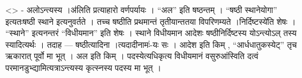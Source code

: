 \textless{}\textgreater{} - अलोऽन्त्यस्य ।अ॑लिति प्रत्याहारो वर्णपर्यायः
। ``अल'' इति षष्ठन्तम् । ``षष्ठी स्थानेयोगा'' इत्यतःषष्ठी स्थाने
इत्यनुवर्तते । तच्च षष्ठीति प्रथमान्तं तृतीयान्ततया विपरिणम्यते
।निर्दिष्टस्ये॑ति शेषः । ``स्थाने'' इत्यनन्तरं ``विधीयमान'' इति शेषः ।
स्थाने विधीयमान आदेशः षष्ठीनिर्दिष्टस्य योऽन्त्योऽल् तस्य स्यादित्यर्थः
। तदाह --- षष्ठीत्यादिना ।त्यदादीनामः॑-यः सः । आदेश इति किम् ,
``आर्धधातुकस्येट्'' तृच ऋकारात् पूर्वो मा भूत् । अल इति किम् ।
पदस्येत्यधिकृत्य विधीयमानं वसुरुआंस्विति दत्वं
परमानडुभ्द्यामित्यत्राऽन्त्यस्य कृत्स्नस्य पदस्य मा भूत् ।
